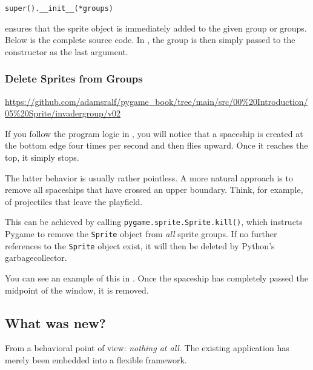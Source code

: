 \verb+super().__init__(*groups)+

ensures that the sprite object is immediately added to the given group or groups. Below is the complete source code. In , the group is then simply passed to the constructor as the last argument.
 


\subsubsection{Delete Sprites from Groups}
\begin{diskbox}
	\url{https://github.com/adamsralf/pygame_book/tree/main/src/00%20Introduction/05%20Sprite/invadergroup/v02}
\end{diskbox}

If you follow the program logic in , you will notice that a spaceship is created at the bottom edge four times per second and then flies upward. Once it reaches the top, it simply stops.

The latter behavior is usually rather pointless. A more natural approach is to remove all spaceships that have crossed an upper boundary. Think, for example, of projectiles that leave the playfield.

This can be achieved by calling \texttt{pygame.sprite.Sprite.kill()}, which instructs Pygame to remove the \texttt{Sprite} object from \emph{all} sprite groups. If no further references to the \texttt{Sprite} object exist, it will then be deleted by Python’s \gls{garbagecollector}.

You can see an example of this in . Once the spaceship has completely passed the midpoint of the window, it is removed.



\subsection{What was new?}
\begin{hintbox}
	From a behavioral point of view: \emph{nothing at all}. The existing application has merely been embedded into a flexible framework.
\end{hintbox}

